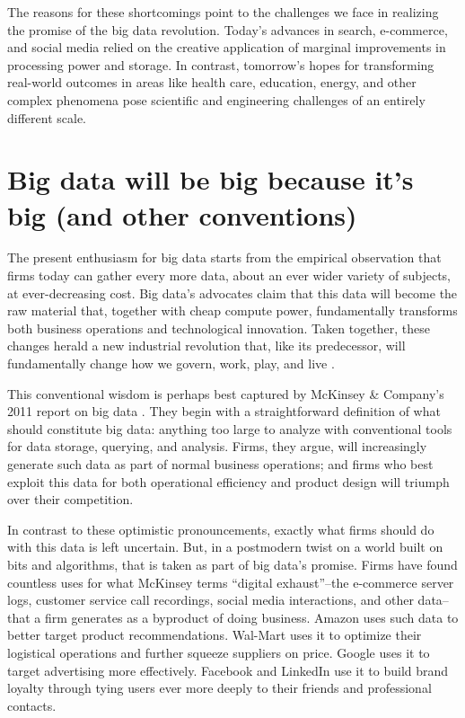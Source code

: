 \documentclass[12pt]{article}
\begin{document}
The reasons for these shortcomings point to the challenges we face in
realizing the promise of the big data revolution. Today's advances in
search, e-commerce, and social media relied on the creative
application of marginal improvements in processing power and
storage. In contrast, tomorrow's hopes for transforming real-world
outcomes in areas like health care, education, energy, and other
complex phenomena pose scientific and engineering challenges of an
entirely different scale. 


\section{Big data will be big because it's big (and other conventions)}
\label{sec:convention-reality}

The present enthusiasm for big data starts from the empirical
observation that firms today can gather every more data, about an ever
wider variety of subjects, at ever-decreasing cost. Big data's
advocates claim that this data will become the raw material that,
together with cheap compute power, fundamentally transforms both
business operations and technological innovation. Taken together,
these changes herald a new industrial revolution that, like its
predecessor, will fundamentally change how we govern, work, play, and
live \citep{mayer2013big}.

This conventional wisdom is perhaps best captured by McKinsey \&
Company's 2011 report on big data \citep{mckinsey2011}. They begin
with a straightforward definition of what should constitute big data:
anything too large to analyze with conventional tools for data
storage, querying, and analysis. Firms, they argue, will increasingly
generate such data as part of normal business operations; and 
firms who best exploit this data for both operational efficiency and
product design will triumph over their competition.

In contrast to these optimistic pronouncements, exactly what firms
should do with this data is left uncertain. But, in a postmodern twist
on a world built on bits and algorithms, that is taken as part of big
data's promise. Firms have found countless uses for what McKinsey
terms ``digital exhaust''--the e-commerce server logs, customer
service call recordings, social media interactions, and other
data--that a firm generates as a byproduct of doing business. Amazon
uses such data to better target product recommendations. Wal-Mart uses
it to optimize their logistical operations and further squeeze
suppliers on price. Google uses it to target advertising more
effectively. Facebook and LinkedIn use it to build brand loyalty
through tying users ever more deeply to their friends and professional
contacts.
\end{document}
